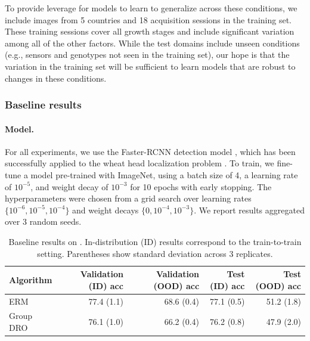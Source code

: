 To provide leverage for models to learn to generalize across these conditions, we include images from 5 countries and 18 acquisition sessions in the training set.
These training sessions cover all growth stages and include significant variation among all of the other factors.
While the test domains include unseen conditions (e.g., sensors and genotypes not seen in the training set), our hope is that the variation in the training set will be sufficient to learn models that are robust to changes in these conditions.

\subsubsection{Baseline results}

\paragraph{Model.}
For all experiments, we use the Faster-RCNN detection model \citep{ren2015faster}, which has been successfully applied to the wheat head localization problem \citep{madec2019ear, david2020global}.
To train, we fine-tune a model pre-trained with ImageNet, using a batch size of 4, a learning rate of $10^{-5}$, and weight decay of $10^{-3}$ for 10 epochs with early stopping.
The hyperparameters were chosen from a grid search over learning rates $\{10^{-6},10^{-5},10^{-4}\}$ and weight decays $\{0, 10^{-4}, 10^{-3}\}$.
We report results aggregated over 3 random seeds.

\begin{table}[tbp]
    \caption{Baseline results on \Wheat. In-distribution (ID) results correspond to the train-to-train setting. Parentheses show standard deviation across 3 replicates.}
  \centering
  \begin{tabular}{lrrrr}
  \toprule
  Algorithm & Validation (ID) acc & Validation (OOD) acc & Test (ID) acc & Test (OOD) acc\\
  \midrule
  ERM        & 77.4 (1.1)      & 68.6 (0.4)       & 77.1 (0.5) & 51.2 (1.8) \\
  Group DRO  & 76.1 (1.0)      & 66.2 (0.4)       & 76.2 (0.8) & 47.9 (2.0) \\
  \bottomrule
  \end{tabular}
  \label{tab:wheat_baseline}
\end{table}

